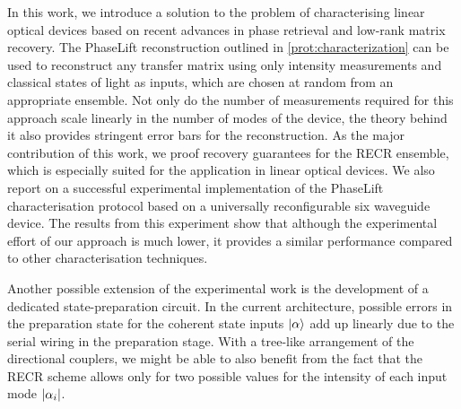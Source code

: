 In this work, we introduce a solution to the problem of characterising linear optical devices based on recent advances in phase retrieval and low-rank matrix recovery.
The PhaseLift reconstruction outlined in \cref{prot:characterization} can be used to reconstruct any transfer matrix using only intensity measurements and classical states of light as inputs, which are chosen at random from an appropriate ensemble.
Not only do the number of measurements required for this approach scale linearly in the number of modes of the device, the theory behind it also provides stringent error bars for the reconstruction.
As the major contribution of this work, we proof recovery guarantees for the RECR ensemble, which is especially suited for the application in linear optical devices.
We also report on a successful experimental implementation of the PhaseLift characterisation protocol based on a universally reconfigurable six waveguide device.
The results from this experiment show that although the experimental effort of our approach is much lower, it provides a similar performance compared to other characterisation techniques.

Another possible extension of the experimental work is the development of a dedicated state-preparation circuit.
In the current architecture, possible errors in the preparation state for the coherent state inputs $\ket{\alpha}$ add up linearly due to the serial wiring in the preparation stage.
With a tree-like arrangement of the directional couplers, we might be able to also benefit from the fact that the RECR scheme allows only for two possible values for the intensity of each input mode ${\vert\alpha_i\vert}$.
